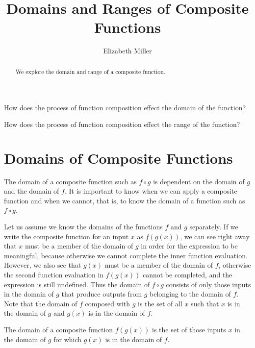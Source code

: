 \documentclass{ximera}
\author{Elizabeth Miller}
\title{Domains and Ranges of Composite Functions}
\begin{document}
\begin{abstract}
   We explore the domain and range of a composite function.
\end{abstract}
\maketitle



\begin{motivatingQuestions}
\item How does the process of function composition effect the domain of the function?
\item How does the process of function composition effect the range of the function?
\end{motivatingQuestions}



\section{Domains of Composite Functions}
The domain of a composite function such as $f \circ g$ is dependent on the domain of $g$ and the domain of $f$. It is important to know when we can apply a composite function and when we cannot, that is, to know the domain of a function such as $f  \circ g$. 

Let us assume we know the domains of the functions $f$ and $g$ separately. If we write the composite function for an input $x$ as $f(g(x))$, we can see right away that $x$ must be a member of the domain of $g$ in order for the expression to be meaningful, because otherwise we cannot complete the inner function evaluation. However, we also see that $g(x)$ must be a member of the domain of $f$, otherwise the second function evaluation in $f(g(x))$ cannot be completed, and the expression is still undefined. Thus the domain of $f \circ g$ consists of only those inputs in the domain of $g$ that produce outputs from $g$ belonging to the domain of $f$. Note that the domain of $f$ composed with $g$ is the set of all $x$ such that $x$ is in the domain of $g$ and $g(x)$ is in the domain of $f$.


\begin{callout}
The domain of a composite function $f(g(x))$ is the set of those inputs $x$ in the domain of $g$ for which $g(x)$ is in the domain of $f$. 
\end{callout}
\end{document}

